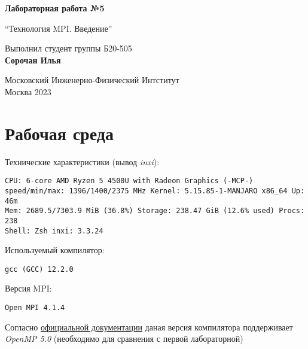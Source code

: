 \documentclass[a4paper, 12pt]{article}
\begin{document}
\hypersetup{pageanchor=false}
\begin{titlepage}
 \begin{center}
  \vspace*{1cm}

  \Huge
  \textbf{Лабораторная работа №5}

  \vspace{0.5cm}
  \LARGE
  ``Технология MPI. Введение''

  \vspace{1.5cm}
  Выполнил студент группы Б20-505\\
  \textbf{Сорочан Илья}

  \vfill

  \Large
  Московский Инженерно-Физический Интститут\\
  Москва 2023

 \end{center}
\end{titlepage}



\section{Рабочая среда}

Технические характеристики (вывод \textit{inxi}):
\begin{verbatim}
CPU: 6-core AMD Ryzen 5 4500U with Radeon Graphics (-MCP-)
speed/min/max: 1396/1400/2375 MHz Kernel: 5.15.85-1-MANJARO x86_64 Up: 46m
Mem: 2689.5/7303.9 MiB (36.8%) Storage: 238.47 GiB (12.6% used) Procs: 238
Shell: Zsh inxi: 3.3.24
\end{verbatim}

Используемый компилятор:
\begin{verbatim}
gcc (GCC) 12.2.0
\end{verbatim}

Версия MPI:
\begin{verbatim}
Open MPI 4.1.4
\end{verbatim}

Согласно \href{https://www.openmp.org/resources/openmp-compilers-tools/}{официальной документации} даная версия компилятора поддерживает \textit{OpenMP 5.0} (необходимо для сравнения с первой лабораторной)


\end{document}
